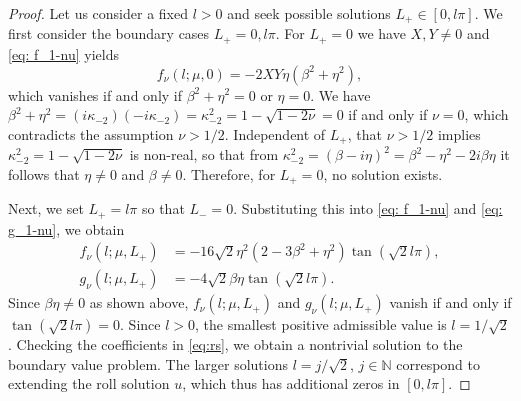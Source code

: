 \documentclass{article}
\numberwithin{equation}{section}
\begin{document}
\begin{proof}
			 Let us consider a fixed $l>0$ and seek possible solutions $L_+\in [0,l\pi]$. We first consider the boundary cases $L_+=0, l\pi$. For $L_+ = 0$ we have $X,Y\neq 0$ and \eqref{eq: f_1-nu} yields
			\begin{equation*}
				f_\nu (l; \mu,0)= -2 X Y \eta (\beta^2 + \eta ^2),
			\end{equation*}  
			which vanishes if and only if $\beta^2 + \eta ^2 = 0$ or $\eta =0$. We have $\beta^2 + \eta ^2 = (i \kappa_{-2}) (-i \kappa_{-2}) = \kappa_{-2}^2 = 1-\sqrt{1-2\nu} =0$ if and only if $\nu =0$, which contradicts the assumption $\nu > 1/2$. Independent of $L_+$, that $\nu > 1/2$ implies $\kappa_{-2}^2 =1-\sqrt{1-2\nu}$ is non-real, so that from $\kappa_{-2}^2 = (\beta - i \eta)^2 = \beta^2 - \eta^2 - 2i \beta \eta$ it follows that $\eta \neq 0$ and $\beta \neq 0$. Therefore, for $L_+ =0$, no solution exists.
			
			Next, we set $L_+ = l\pi$ so that $L_-=0$.  Substituting this into \eqref{eq: f_1-nu} and \eqref{eq: g_1-nu}, we obtain
			\begin{align*}
				f_\nu (l; \mu,L_+) 
				&= -16\sqrt{2}\eta^2 (2 - 3\beta^2 + \eta^2)\tan(\sqrt{2}l\pi),\\
				g_\nu (l; \mu,L_+) 
				&= -4\sqrt{2}\beta\eta\tan(\sqrt{2}l\pi) .
			\end{align*}
			Since $\beta\eta\neq 0$ as shown above, $f_\nu(l;\mu,L_+)$ and $g_\nu(l;\mu,L_+)$ vanish if and only if $\tan(\sqrt{2}l\pi)=0$. 
			Since $l>0$, the smallest positive admissible value is $l=1/\sqrt{2}$. Checking the coefficients in \eqref{eq:rs},  
			we obtain a nontrivial solution to the boundary value problem. The larger solutions $l=j/\sqrt{2}$, $j\in\mathbb{N}$ correspond to extending the roll solution $u$, which thus has additional zeros in $[0,l\pi]$.
			

\end{proof}
\end{document}
